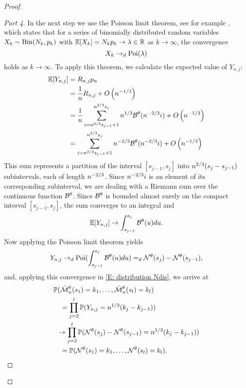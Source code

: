 \begin{proof}
\begin{proof}[Part 4]
In the next step we use the Poisson limit theorem, see for example \cite[Theorem 3.7, p.79]{Klenke.2006},
which states that for a series of binomially distributed random variables $X_k \sim \operatorname*{Bin}(N_k, p_k)$
with $\mathbb{E}[X_k] = N_k p_k \rightarrow \lambda \in \mathbb{R}$ as $k \rightarrow \infty$,
the convergence 
\begin{equation}
	X_k \rightarrow_d \operatorname*{Poi}(\lambda)
\end{equation}
holds as $k \rightarrow \infty$.
To apply this theorem, we calculate the expected value of $Y_{n,j}$:
\begin{align*}
\mathbb{E}[Y_{n,j}] 
&= R_{n,j} p_n \\
&= \frac{1}{n} R_{n,j} + O\left(n^{-1 / 3}\right)\\
&= \frac{1}{n} \sum_{i=n^{2 / 3}s_{j-1}+1}^{n^{2 / 3}s_j}n^{1 / 3}\mathcal{B}^{\theta}(n^{-2 / 3}i) + O\left(n^{-1 / 3}\right)\\
&= \sum_{i=n^{2 / 3}s_{j-1}+1}^{n^{2 / 3}s_j}n^{-2 / 3}\mathcal{B}^{\theta}(n^{-2 / 3}i) + O\left(n^{-1 / 3}\right)
\end{align*}
This sum represents a partition of the interval $[s_{j-1}, s_j]$ into $n^{2 / 3}(s_j - s_{j-1})$ subintervals, each of length $n^{-2 / 3}$.
Since $n^{-2 / 3}i$ is an element of its corresponding subinterval, 
we are dealing with a Riemann sum over the continuous function $\mathcal{B}^{\theta}$.
Since $\mathcal{B}^{\theta}$ is bounded almost surely on the compact interval $[s_{j-1}, s_j]$,
the sum converges to an integral and
\begin{equation}
\mathbb{E}[Y_{n,j}] \rightarrow \int_{s_{j-1}}^{s_j} \mathcal{B}^{\theta}(u)du.
\end{equation}
Now applying the Poisson limit theorem yields
\begin{equation} \label{E: convergence dist Yj}
Y_{n,j} \rightarrow_d \operatorname*{Poi}( \int_{s_{j-1}}^{s_j} \mathcal{B}^{\theta}(u)du ) =_d \mathcal{N}^{\theta}(s_j) - \mathcal{N}^{\theta}(s_{j-1}),
\end{equation}
and, applying this convergence in \eqref{E: distribution Ndis}, we arrive at
\begin{equation*}
\begin{aligned}
&\mathbb{P}(\bar{\mathcal{M}}_n^{\theta}(s_1) = k_1, \dots, \bar{\mathcal{M}}_n^{\theta}(s_l) = k_l) \\
&\quad = \prod_{j=2}^{l} \mathbb{P}( Y_{n,j} = n^{1 / 3}(k_j - k_{j-1}) ) \\
&\enspace \rightarrow \prod_{j=2}^{l} \mathbb{P}( \mathcal{N}^{\theta}(s_j) - \mathcal{N}^{\theta}(s_{j-1}) = n^{1 / 3}(k_j - k_{j-1}) ) \\
&\quad = \mathbb{P}(\mathcal{N}^{\theta}(s_1) = k_1, \dots, \mathcal{N}^{\theta}(s_l) = k_l).
\end{aligned}
\end{equation*}


\end{proof}
\end{proof}
